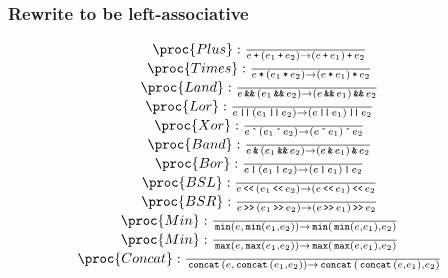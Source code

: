 \begin{frame}

\frametitle{Rewrite to be left-associative}

\footnotesize
\[
\begin{matrix}
\proc{Plus}:{\over
e \lp \p{e_1 \lp e_2} \rightarrow \p{ e \lp e_1} \lp e_2
}\\
\proc{Times}:{\over
e \lt \p{e_1\lt e_2} \rightarrow \p{e \lt e_1} \lt e_2
}\\
\proc{Land}:{\over
e \LAND \p{e_1 \LAND e_2} \rightarrow \p{ e \LAND e_1} \LAND e_2
}\\
\proc{Lor}:{\over
e \LOR \p{e_1\LOR e_2} \rightarrow \p{e \LOR e_1} \LOR e_2
}\\
\proc{Xor}:{\over
e \LBXOR \p{e_1 \LBXOR e_2} \rightarrow \p{ e \LBXOR e_1} \LBXOR e_2
}\\
\proc{Band}:{\over
e \LBAND \p{e_1 \LAND e_2} \rightarrow \p{ e \LBAND e_1} \LBAND e_2
}\\
\proc{Bor}:{\over
e \LBOR \p{e_1\LBOR e_2} \rightarrow \p{e \LBOR e_1} \LBOR e_2
}\\
\proc{BSL}:{\over
e \LBSL \p{e_1 \LBSL e_2} \rightarrow \p{ e \LBSL e_1} \LBSL e_2
}\\
\proc{BSR}:{\over
e \LBSR \p{e_1\LBSR e_2} \rightarrow \p{e \LBSR e_1} \LBSR e_2
}\\
\proc{Min}:{\over
\LMIN\p{e, \LMIN\p{e_1, e_2}} \rightarrow \LMIN\p{\LMIN\p{ e, e_1}, e_2}
}\\
\proc{Min}:{\over
\LMAX\p{e, \LMAX\p{e_1, e_2}} \rightarrow \LMAX\p{\LMAX\p{ e, e_1}, e_2}
}\\
\proc{Concat}:{\over
\LCONCAT\p{e, \LCONCAT\p{e_1, e_2}} \rightarrow \LCONCAT\p{\LCONCAT\p{ e, e_1}, e_2}
}\\
\end{matrix}
\]

\end{frame}

